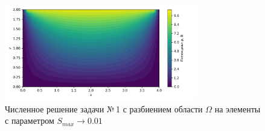 \documentclass[12pt, a4paper]{article}
\begin{document}
					
					
					
					
				
			
			
			
			\begin{figure}[!h]
				\centering
				\includegraphics[width=0.75\textwidth]{rect_dirichlet_only_001_calfem.png}
				\caption{Численное решение задачи №\,1 с разбиением области $\Omega$ на элементы с параметром $S_{max} \rightarrow 0.01$}
				\label{fig:dom_rect_001}
			\end{figure}
			
\end{document}
